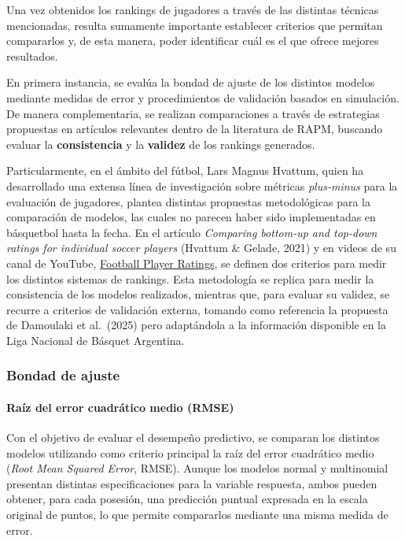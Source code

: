 \documentclass[
  12pt,
]{article}
\begin{document}
Una vez obtenidos los rankings de jugadores a través de las distintas
técnicas mencionadas, resulta sumamente importante establecer criterios
que permitan compararlos y, de esta manera, poder identificar cuál es el
que ofrece mejores resultados.

En primera instancia, se evalúa la bondad de ajuste de los distintos
modelos mediante medidas de error y procedimientos de validación basados
en simulación. De manera complementaria, se realizan comparaciones a
través de estrategias propuestas en artículos relevantes dentro de la
literatura de RAPM, buscando evaluar la \textbf{consistencia} y la
\textbf{validez} de los rankings generados.

Particularmente, en el ámbito del fútbol, Lars Magnus Hvattum, quien ha
desarrollado una extensa línea de investigación sobre métricas
\emph{plus-minus} para la evaluación de jugadores, plantea distintas
propuestas metodológicas para la comparación de modelos, las cuales no
parecen haber sido implementadas en básquetbol hasta la fecha. En el
artículo \emph{Comparing bottom-up and top-down ratings for individual
soccer players} (Hvattum \& Gelade, 2021) y en videos de su canal de
YouTube, \href{https://www.youtube.com/@footballplayerratings}{Football
Player Ratings}, se definen dos criterios para medir los distintos
sistemas de rankings. Esta metodología se replica para medir la
consistencia de los modelos realizados, mientras que, para evaluar su
validez, se recurre a criterios de validación externa, tomando como
referencia la propuesta de Damoulaki et al.~(2025) pero adaptándola a la
información disponible en la Liga Nacional de Básquet Argentina.

\subsubsection{Bondad de ajuste}\label{bondad-de-ajuste}

\paragraph{Raíz del error cuadrático medio
(RMSE)}\label{rauxedz-del-error-cuadruxe1tico-medio-rmse}

Con el objetivo de evaluar el desempeño predictivo, se comparan los
distintos modelos utilizando como criterio principal la raíz del error
cuadrático medio (\textit{Root Mean Squared Error}, RMSE). Aunque los
modelos normal y multinomial presentan distintas especificaciones para
la variable respuesta, ambos pueden obtener, para cada posesión, una
predicción puntual expresada en la escala original de puntos, lo que
permite compararlos mediante una misma medida de error.
\end{document}
